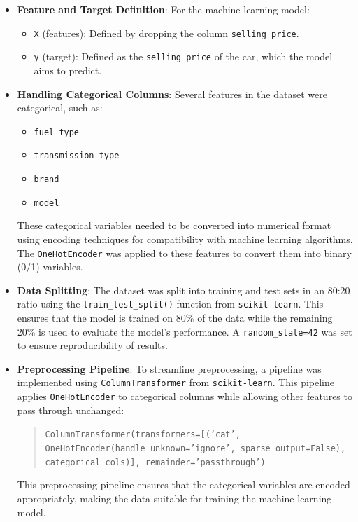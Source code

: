 \documentclass[a4paper,12pt]{article}
\begin{document}
\begin{justify}
\begin{itemize}
		\item \textbf{Feature and Target Definition}: For the machine learning model:
		\begin{itemize}
			\item \texttt{X} (features): Defined by dropping the column \texttt{selling\_price}.
			\item \texttt{y} (target): Defined as the \texttt{selling\_price} of the car, which the model aims to predict.
		\end{itemize}
		
		\item \textbf{Handling Categorical Columns}: Several features in the dataset were categorical, such as:
		\begin{itemize}
			\item \texttt{fuel\_type}
			\item \texttt{transmission\_type}
			\item \texttt{brand}
			\item \texttt{model}
		\end{itemize}
		These categorical variables needed to be converted into numerical format using encoding techniques for compatibility with machine learning algorithms. The \texttt{OneHotEncoder} was applied to these features to convert them into binary (0/1) variables.
		
		\item \textbf{Data Splitting}: The dataset was split into training and test sets in an 80:20 ratio using the \texttt{train\_test\_split()} function from \texttt{scikit-learn}. This ensures that the model is trained on 80\% of the data while the remaining 20\% is used to evaluate the model's performance. A \texttt{random\_state=42} was set to ensure reproducibility of results.
		
		\item \textbf{Preprocessing Pipeline}: To streamline preprocessing, a pipeline was implemented using \texttt{ColumnTransformer} from \texttt{scikit-learn}. This pipeline applies \texttt{OneHotEncoder} to categorical columns while allowing other features to pass through unchanged:
		\begin{quote}
			\texttt{ColumnTransformer(transformers=[('cat', OneHotEncoder(handle\_unknown='ignore', sparse\_output=False), categorical\_cols)], remainder='passthrough')}
		\end{quote}
		This preprocessing pipeline ensures that the categorical variables are encoded appropriately, making the data suitable for training the machine learning model.
		
	\end{itemize}
	
\end{justify}
\end{document}
